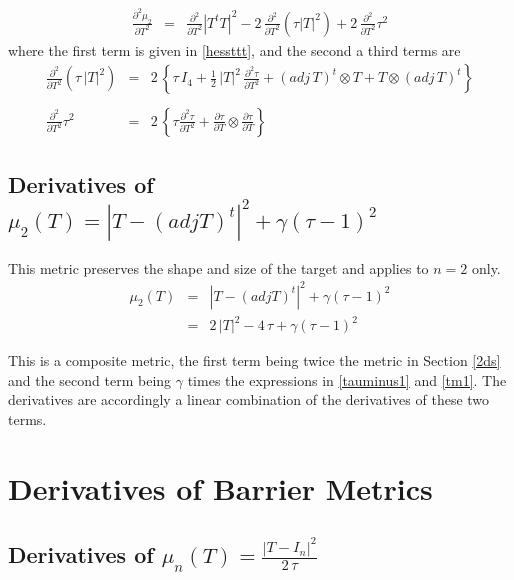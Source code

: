 \documentclass{report}
\begin{document}
\begin{eqnarray}
\frac{\partial^2 \mu_2}{\partial T^2} & = & \frac{\partial^2}{\partial T^2} |T^t T|^2 - 2 \, \frac{\partial^2}{\partial T^2} \left( \tau |T|^2 \right) + 2 \, \frac{\partial^2}{\partial T^2} \tau^2
\end{eqnarray}
where the first term is given in \ref{hessttt}, and the second a third terms are
\begin{eqnarray}
\frac{\partial^2}{\partial T^2} \left( \tau \, |T|^2 \right) & = & 2 \, \left\{ \tau \, I_4 + \frac{1}{2} \, |T|^2 \, \frac{\partial^2 \tau}{\partial T^2} + (adj \, T)^t \otimes T + T \otimes (adj \, T)^t \right\} \nonumber \\
 \\
\frac{\partial^2}{\partial T^2} \tau^2 & = & 2 \, \left\{ \tau \frac{\partial^2 \tau}{\partial T^2} + \frac{\partial \tau}{\partial T} \otimes \frac{\partial \tau}{\partial T} \right\}
\end{eqnarray}

\subsection{Derivatives of $\mu_2(T)=|T-(adj T)^t|^2 + \gamma (\tau-1)^2$ \label{ss2d} }

This metric preserves the shape and size of the target and applies to $n=2$ only.
\begin{eqnarray}
\mu_2 (T) & = & |T-(adj T)^t|^2 + \gamma (\tau-1)^2 \\
          & = & 2 \, |T|^2 - 4 \, \tau  + \gamma (\tau-1)^2
\end{eqnarray}

\noindent This is a composite metric, the first term being twice the 
metric in Section \ref{2ds} and the second term being $\gamma$ times the
expressions in \ref{tauminus1} and \ref{tm1}. The derivatives are accordingly 
a linear combination of the derivatives of these two terms. \newline

\section{Derivatives of Barrier Metrics}

\subsection{Derivatives of $\mu_n(T)=\frac{|T-I_n|^2}{2 \, \tau}$ \label{sso+}}
\end{document}
